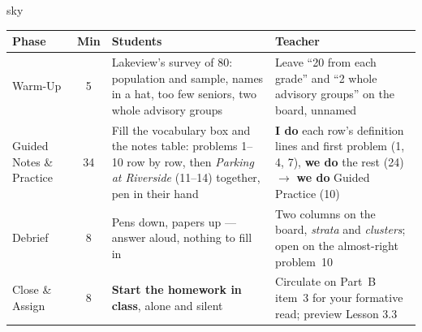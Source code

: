 \documentclass[10pt]{article}
\begin{document}
\boxguard[30]
\begin{skillbox}{sky}
\renewcommand{\arraystretch}{1.25}
\begin{tabularx}{\linewidth}{@{}l c X X@{}}
\textbf{Phase} & \textbf{Min} & \textbf{Students} & \textbf{Teacher} \\
\hline
Warm-Up & 5 & Lakeview's survey of 80: population and sample, names in a hat, too few seniors,
two whole advisory groups & Leave ``20 from each grade'' and ``2 whole advisory groups'' on the
board, unnamed \\
Guided Notes \& Practice & 34 & Fill the vocabulary box and the notes table: problems 1--10 row
by row, then \emph{Parking at Riverside} (11--14) together, pen in their hand & \textbf{I do}
each row's definition lines and first problem (1, 4, 7), \textbf{we do} the rest (24)
$\to$ \textbf{we do} Guided Practice (10) \\
Debrief & 8 & Pens down, papers up --- answer aloud, nothing to fill in & Two columns on the
board, \emph{strata} and \emph{clusters}; open on the almost-right problem~10 \\
Close \& Assign & 8 & \textbf{Start the homework in class}, alone and silent & Circulate on
Part~B item~3 for your formative read; preview Lesson 3.3 \\
\end{tabularx}
\end{skillbox}
\end{document}
